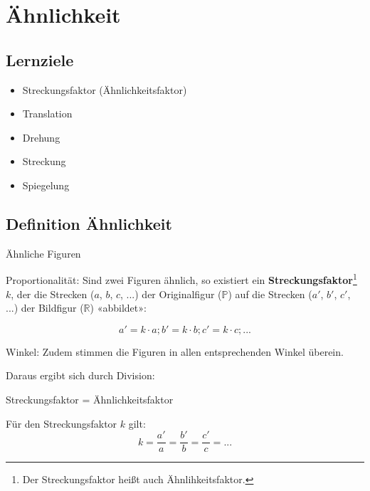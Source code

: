 
\section{Ähnlichkeit}

\subsection*{Lernziele}

\begin{itemize}
\item Streckungsfaktor (Ähnlichkeitsfaktor)
\item Translation
\item Drehung
\item Streckung
\item Spiegelung
\end{itemize}

\newpage


\subsection{Definition Ähnlichkeit}



\begin{definition}{Ähnliche Figuren}{}
  
Proportionalität: Sind zwei Figuren ähnlich, so existiert ein
\textbf{Streckungsfaktor}\footnote{Der
  Streckungsfaktor heißt auch Ähnlihkeitsfaktor.}
$k$, der die Strecken ($a$, $b$, $c$, ...) der Originalfigur
($\mathbb{P}$) auf die Strecken ($a'$, $b'$, $c'$, ...) der Bildfigur
($\mathbb{R}$) «abbildet»:

$$a' = k\cdot{}a; b' = k\cdot{}b; c' = k\cdot{} c; ...$$

Winkel: Zudem stimmen die Figuren in allen entsprechenden Winkel überein.
\end{definition}

Daraus ergibt sich durch Division:
\begin{gesetz}{Streckungsfaktor
    = Ähnlichkeitsfaktor}{}

  Für den Streckungsfaktor $k$ gilt:
  $$k = \frac{a'}{a} = \frac{b'}{b} = \frac{c'}{c} = ...$$
\end{gesetz}

